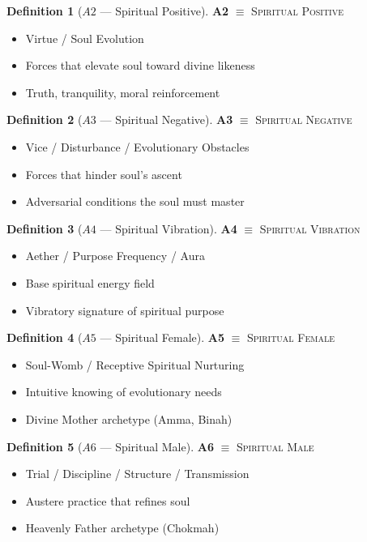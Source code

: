 \documentclass[11pt,twoside,openright]{book}
\theoremstyle{definition}
\newtheorem{definition}{Definition}[chapter]
\theoremstyle{plain}
\theoremstyle{remark}
\begin{document}
\begin{definition}[$A2$ --- Spiritual Positive]
\label{def:A2}
\textbf{A2} $\equiv$ \textsc{Spiritual Positive}
\begin{itemize}
  \item Virtue / Soul Evolution
  \item Forces that elevate soul toward divine likeness
  \item Truth, tranquility, moral reinforcement
\end{itemize}
\end{definition}

\begin{definition}[$A3$ --- Spiritual Negative]
\label{def:A3}
\textbf{A3} $\equiv$ \textsc{Spiritual Negative}
\begin{itemize}
  \item Vice / Disturbance / Evolutionary Obstacles
  \item Forces that hinder soul's ascent
  \item Adversarial conditions the soul must master
\end{itemize}
\end{definition}

\begin{definition}[$A4$ --- Spiritual Vibration]
\label{def:A4}
\textbf{A4} $\equiv$ \textsc{Spiritual Vibration}
\begin{itemize}
  \item Aether / Purpose Frequency / Aura
  \item Base spiritual energy field
  \item Vibratory signature of spiritual purpose
\end{itemize}
\end{definition}

\begin{definition}[$A5$ --- Spiritual Female]
\label{def:A5}
\textbf{A5} $\equiv$ \textsc{Spiritual Female}
\begin{itemize}
  \item Soul-Womb / Receptive Spiritual Nurturing
  \item Intuitive knowing of evolutionary needs
  \item Divine Mother archetype (Amma, Binah)
\end{itemize}
\end{definition}

\begin{definition}[$A6$ --- Spiritual Male]
\label{def:A6}
\textbf{A6} $\equiv$ \textsc{Spiritual Male}
\begin{itemize}
  \item Trial / Discipline / Structure / Transmission
  \item Austere practice that refines soul
  \item Heavenly Father archetype (Chokmah)
\end{itemize}
\end{definition}
\end{document}
